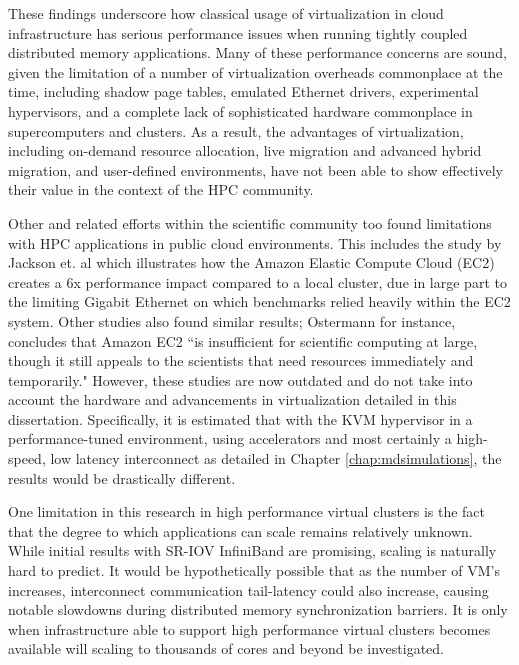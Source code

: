 These findings underscore how classical usage of virtualization in cloud infrastructure has serious performance issues when running tightly coupled distributed memory applications. Many of these performance concerns are sound, given the limitation of a number of virtualization overheads commonplace at the time, including shadow page tables, emulated Ethernet drivers, experimental hypervisors, and a complete lack of sophisticated hardware commonplace in supercomputers and clusters.  As a result, the advantages of virtualization, including on-demand resource allocation, live migration and advanced hybrid migration, and user-defined environments, have not been able to show effectively their value in the context of the HPC community.

Other and related efforts within the scientific community too found limitations with HPC applications in public cloud environments. This includes the study by Jackson et. al \cite{jackson2010performance} which illustrates how the Amazon Elastic Compute Cloud (EC2) creates a 6x performance impact compared to a local cluster, due in large part to the limiting Gigabit Ethernet on which benchmarks relied heavily within the EC2 system. Other studies also found similar results; Ostermann \cite{ostermann2009performance} for instance, concludes that Amazon EC2 ``is insufficient for scientific computing at large, though it still appeals to the scientists that need resources immediately and temporarily."  However, these studies are now outdated and do not take into account the hardware and advancements in virtualization detailed in this dissertation. Specifically, it is estimated that with the KVM hypervisor in a performance-tuned environment, using accelerators and most certainly a high-speed, low latency interconnect as detailed in Chapter \ref{chap:mdsimulations}, the results would be drastically different. 


One limitation in this research in high performance virtual clusters is the fact that the degree to which applications can scale remains relatively unknown. While initial results with SR-IOV InfiniBand are promising, scaling is naturally hard to predict. It would be hypothetically possible that as the number of VM's increases, interconnect communication tail-latency could also increase, causing notable slowdowns during distributed memory synchronization barriers. It is only when infrastructure able to support high performance virtual clusters becomes available will scaling to thousands of cores and beyond be investigated.  

